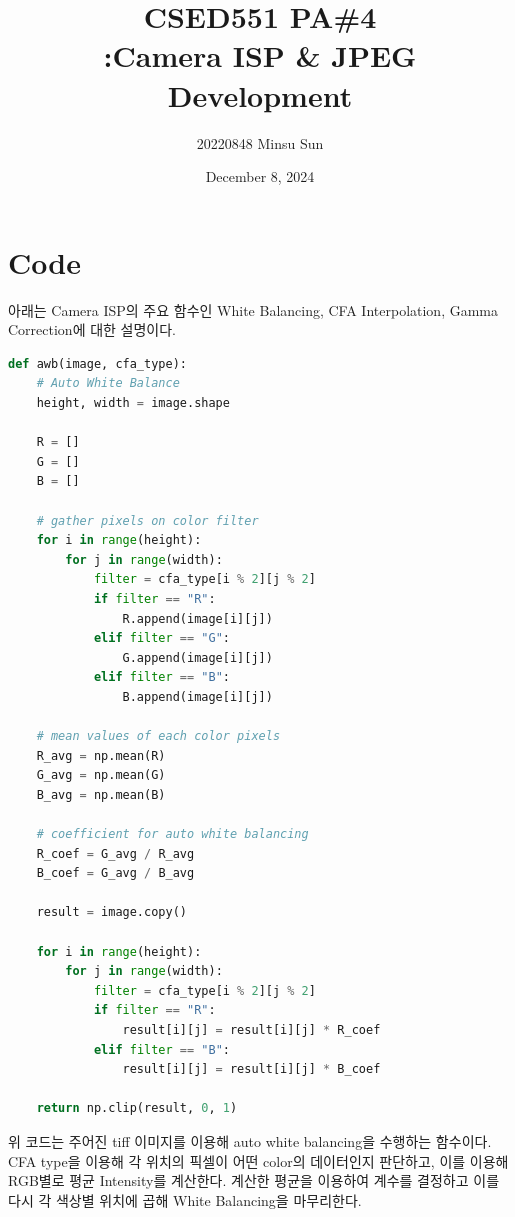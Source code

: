 \documentclass{report}
\title{CSED551 PA\#4 \\[0.5ex] {\normalsize :Camera ISP \& JPEG Development}}
\author{\small{20220848 Minsu Sun}}
\date{\small{December 8, 2024}}
\begin{document}
\maketitle

\section*{Code}

아래는 Camera ISP의 주요 함수인 White Balancing, CFA Interpolation, Gamma Correction에 대한 설명이다.

\begin{lstlisting}[language=Python, caption=awb, firstnumber=15]
def awb(image, cfa_type):
    # Auto White Balance
    height, width = image.shape

    R = []
    G = []
    B = []

    # gather pixels on color filter
    for i in range(height):
        for j in range(width):
            filter = cfa_type[i % 2][j % 2]
            if filter == "R":
                R.append(image[i][j])
            elif filter == "G":
                G.append(image[i][j])
            elif filter == "B":
                B.append(image[i][j])

    # mean values of each color pixels
    R_avg = np.mean(R)
    G_avg = np.mean(G)
    B_avg = np.mean(B)

    # coefficient for auto white balancing
    R_coef = G_avg / R_avg
    B_coef = G_avg / B_avg

    result = image.copy()

    for i in range(height):
        for j in range(width):
            filter = cfa_type[i % 2][j % 2]
            if filter == "R":
                result[i][j] = result[i][j] * R_coef
            elif filter == "B":
                result[i][j] = result[i][j] * B_coef

    return np.clip(result, 0, 1)
\end{lstlisting}

위 코드는 주어진 tiff 이미지를 이용해 auto white balancing을 수행하는 함수이다.
CFA type을 이용해 각 위치의 픽셀이 어떤 color의 데이터인지 판단하고, 이를 이용해 RGB별로 평균 Intensity를 계산한다.
계산한 평균을 이용하여 계수를 결정하고 이를 다시 각 색상별 위치에 곱해 White Balancing을 마무리한다.
\end{document}
